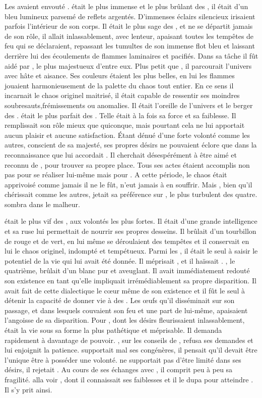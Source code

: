 Les \Dormus avaient envouté \Mey. \Boromu était le plus immense et le plus brûlant des \SerpentsCosmiques, il était d'un bleu lumineux parsemé de reflets argentés. D'immenses éclairs silencieux irisaient parfois l'intérieur de son corps. Il était le plus sage des \Dormus, et ne se départit jamais de son rôle, il allait inlassablement, avec lenteur, apaisant toutes les tempêtes de feu qui se déclaraient, repassant les tumultes de son immense flot bleu et laissant derrière lui des écoulements de flammes laminaires et pacifiés. Dans sa tâche il fût aidé par \Esu, le plus majestueux d'entre eux. Plus petit que \Boromu, il parcourait l'univers avec hâte et aisance. Ses couleurs étaient les plus belles, en lui les flammes jouaient harmonieusement de la palette du chaos tout entier. En ce sens il incarnait le chaos originel maitrisé, il était capable de ressentir ses moindres soubresauts,frémissements ou anomalies. Il était l'oreille de l'univers et le berger des \SerpentsCosmiques. \Esu était le plus parfait des \Dormus. Telle était à la fois sa force et sa faiblesse. Il remplissait son rôle mieux que quiconque, mais pourtant cela ne lui apportait aucun plaisir et aucune satisfaction. Étant dénué d'une forte volonté comme les autres, conscient de sa majesté, ses propres désirs ne pouvaient éclore que dans la reconnaissance que lui accordait \Mey. Il cherchait désespérément à être aimé et reconnu de \Mey, pour trouver sa propre place. Tous ses actes étaient accomplis non pas pour se réaliser lui-même mais pour \Mey. A cette période, le chaos était apprivoisé comme jamais il ne le fût, \Mey n'eut jamais à en souffrir. Mais \Mey, bien qu'il chérissait \Esu comme les autres, jetait sa préférence sur \Ogo, le plus turbulent des quatre. \Esu sombra dans le malheur.

\Ogo était le plus vif des \Dormus, aux volontés les plus fortes. Il était d'une grande intelligence et sa ruse lui permettait de nourrir ses propres desseins. Il brûlait d'un tourbillon de rouge et de vert, en lui même se déroulaient des tempêtes et il conservait en lui le chaos originel, indompté et tempétueux. Parmi les \Dormus, il était le seul à saisir le potentiel de la vie qui lui avait été donnée. Il méprisait \Boromu, et il haïssait \Tot. \Tot, le quatrième, brûlait d'un blanc pur et aveuglant. Il avait immédiatement redouté son existence en tant qu'elle impliquait irrémédiablement sa propre disparition. Il avait fait de cette dialectique le cœur même de son existence et il fût le seul à détenir la capacité de donner vie à des \SerpentsCosmiques. Les œufs qu'il disséminait sur son passage, et dans lesquels couvaient son feu et une part de lui-même, apaisaient l'angoisse de sa disparition. Pour \Ogo, dont les désirs fleurissaient inlassablement, \Tot
était la vie sous sa forme la plus pathétique et méprisable. Il demanda rapidement à \Mey davantage de pouvoir. \Mey, sur les conseils de \Cind, refusa ses demandes et lui enjoignit la patience. \Ogo supportait mal ses congénères, il pensait qu'il devait être l'unique être à posséder une volonté. \Ogo ne supportait pas d'être limité dans ses désirs, il rejetait \Mey. Au cours de ses échanges avec \Mey, il comprit peu à peu sa fragilité. \Ogo alla voir \Esu, dont il connaissait ses faiblesses et il le dupa pour atteindre \Mey. Il s'y prit ainsi.


